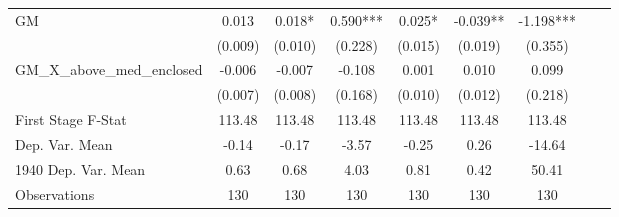 \begin{tabular}{l*{8}{c}}
\cmidrule(lr){1-7}
GM              &    0.013   &    0.018*  &    0.590***&    0.025*  &   -0.039** &   -1.198***\\
                &  (0.009)   &  (0.010)   &  (0.228)   &  (0.015)   &  (0.019)   &  (0.355)   \\
\addlinespace
GM\_X\_above\_med\_enclosed&   -0.006   &   -0.007   &   -0.108   &    0.001   &    0.010   &    0.099   \\
                &  (0.007)   &  (0.008)   &  (0.168)   &  (0.010)   &  (0.012)   &  (0.218)   \\
\midrule
First Stage F-Stat&   113.48   &   113.48   &   113.48   &   113.48   &   113.48   &   113.48   \\
Dep. Var. Mean  &    -0.14   &    -0.17   &    -3.57   &    -0.25   &     0.26   &   -14.64   \\
1940 Dep. Var. Mean&     0.63   &     0.68   &     4.03   &     0.81   &     0.42   &    50.41   \\
Observations    &      130   &      130   &      130   &      130   &      130   &      130   \\
       \bottomrule \end{tabular}
